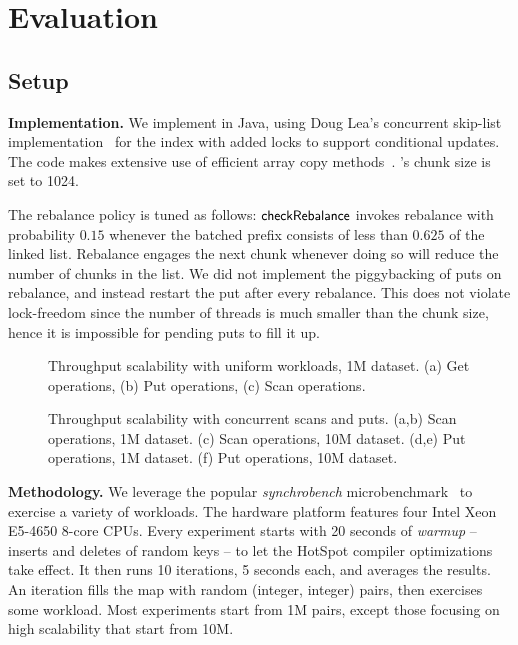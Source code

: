 \section{Evaluation}
\label{sec:eval}

\subsection{Setup}

{\bf Implementation.} We implement {\kiwi} in Java, using Doug Lea's concurrent skip-list 
implementation~\cite{JavaConcurrentSkipList} for the index with added locks to support conditional updates. 
The code makes extensive use of efficient 
array copy methods~\cite{JavaArrayCopy}. {\kiwi}'s chunk size is set to 1024. 

The rebalance policy is tuned as follows:
$\code{checkRebalance}$  invokes rebalance with probability $0.15$ whenever
 the batched prefix consists of less than $0.625$ of the linked list. Rebalance 
engages the next chunk whenever doing so will reduce the number of chunks in the list. 
We did not implement the piggybacking of puts on rebalance, and instead restart the put after every rebalance.
This does not violate lock-freedom since the number of threads is much smaller than the chunk size,  
hence it is impossible for pending puts to fill it up. %

\begin{figure*}
\begin{center}

\end{center}
\caption{Throughput scalability with uniform workloads, 1M dataset. (a) Get operations, (b) Put operations, (c) Scan operations. }
\label{evaluation:results:getputscan}
\end{figure*}

\begin{figure*}
\begin{center}

\end{center}
\caption{Throughput scalability with concurrent scans and puts. (a,b) Scan operations, 1M dataset. 
(c) Scan operations, 10M dataset. (d,e) Put operations, 1M dataset. (f) Put operations, 10M dataset.  }
\label{evaluation:results:scan}
\end{figure*}

\textbf{Methodology.}
We leverage the popular {\em synchrobench}  microbenchmark~\cite{Gramoli2015}
to exercise a variety of workloads. The hardware platform %
features four Intel Xeon E5-4650 8-core CPUs. %
Every experiment starts with 20 seconds of {\em warmup} -- inserts
and deletes of random keys -- to let the HotSpot compiler optimizations take effect. 
It then runs 10  iterations, 5 seconds each, and averages the results. An iteration fills the map with 
random (integer, integer) pairs, then exercises some workload. 
Most experiments start from 1M pairs, except those focusing on high scalability that start from 10M.

